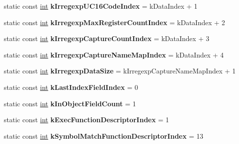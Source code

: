 \begin{DoxyCompactItemize}
static const \mbox{\hyperlink{classint}{int}} {\bfseries k\+Irregexp\+U\+C16\+Code\+Index} = k\+Data\+Index + 1
\item 
\mbox{\label{classv8_1_1internal_1_1JSRegExp_a6a3fe9d11dfd961544062fff4af53726}} 
static const \mbox{\hyperlink{classint}{int}} {\bfseries k\+Irregexp\+Max\+Register\+Count\+Index} = k\+Data\+Index + 2
\item 
\mbox{\label{classv8_1_1internal_1_1JSRegExp_a0e2173e190617f634aed74000af8f412}} 
static const \mbox{\hyperlink{classint}{int}} {\bfseries k\+Irregexp\+Capture\+Count\+Index} = k\+Data\+Index + 3
\item 
\mbox{\label{classv8_1_1internal_1_1JSRegExp_ab1efda1af43cef50b7b318034557f842}} 
static const \mbox{\hyperlink{classint}{int}} {\bfseries k\+Irregexp\+Capture\+Name\+Map\+Index} = k\+Data\+Index + 4
\item 
\mbox{\label{classv8_1_1internal_1_1JSRegExp_ab5b2b03b911c494d666b474d4e686233}} 
static const \mbox{\hyperlink{classint}{int}} {\bfseries k\+Irregexp\+Data\+Size} = k\+Irregexp\+Capture\+Name\+Map\+Index + 1
\item 
\mbox{\label{classv8_1_1internal_1_1JSRegExp_acbd49fd9b1fd11429c5e34bdfa8075a4}} 
static const \mbox{\hyperlink{classint}{int}} {\bfseries k\+Last\+Index\+Field\+Index} = 0
\item 
\mbox{\label{classv8_1_1internal_1_1JSRegExp_aa2a8207a8ea8c66ba8aaa6b55c5f0f92}} 
static const \mbox{\hyperlink{classint}{int}} {\bfseries k\+In\+Object\+Field\+Count} = 1
\item 
\mbox{\label{classv8_1_1internal_1_1JSRegExp_af0b14fff35308090267881f4b290e49c}} 
static const \mbox{\hyperlink{classint}{int}} {\bfseries k\+Exec\+Function\+Descriptor\+Index} = 1
\item 
\mbox{\label{classv8_1_1internal_1_1JSRegExp_ace06f91be0e6a4e959ac337ed33659ad}} 
static const \mbox{\hyperlink{classint}{int}} {\bfseries k\+Symbol\+Match\+Function\+Descriptor\+Index} = 13

\end{DoxyCompactItemize}

